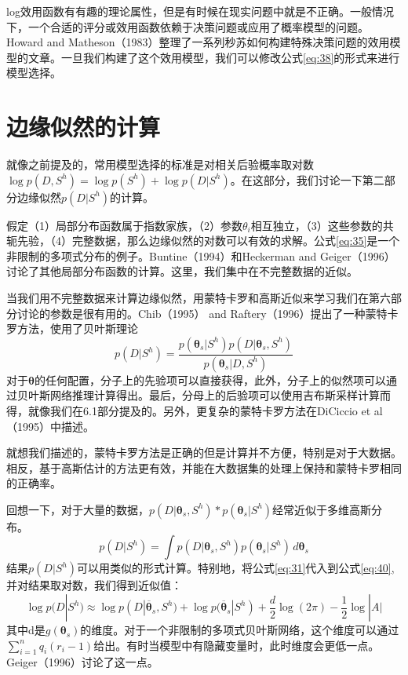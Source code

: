 \documentclass[10pt,a4paper]{article}
\begin{document}
\begin{CJK*}{UTF8}{gkai}
log效用函数有有趣的理论属性，但是有时候在现实问题中就是不正确。一般情况下，一个合适的评分或效用函数依赖于决策问题或应用了概率模型的问题。Howard and Matheson（1983）整理了一系列秒苏如何构建特殊决策问题的效用模型的文章。一旦我们构建了这个效用模型，我们可以修改公式\ref{eq:38}的形式来进行模型选择。



\section{边缘似然的计算}
就像之前提及的，常用模型选择的标准是对相关后验概率取对数$\log p(D,S^h)=\log p(S^h)+\log p(D|S^h)$。在这部分，我们讨论一下第二部分边缘似然$p(D|S^h)$的计算。


假定（1）局部分布函数属于指数家族，（2）参数$\theta_i$相互独立，（3）这些参数的共轭先验，（4）完整数据，那么边缘似然的对数可以有效的求解。公式\ref{eq:35}是一个非限制的多项式分布的例子。Buntine（1994）和Heckerman and Geiger（1996）讨论了其他局部分布函数的计算。这里，我们集中在不完整数据的近似。


当我们用不完整数据来计算边缘似然，用蒙特卡罗和高斯近似来学习我们在第六部分讨论的参数是很有用的。Chib（1995） and Raftery（1996）提出了一种蒙特卡罗方法，使用了贝叶斯理论
\begin{equation}
p(D|S^h)=\frac{p(\boldsymbol{\theta}_s|S^h)p(D|\boldsymbol{\theta}_s,S^h)}{p(\boldsymbol{\theta}_s|D,S^h)}
\end{equation}
对于$\boldsymbol{\theta}$的任何配置，分子上的先验项可以直接获得，此外，分子上的似然项可以通过贝叶斯网络推理计算得出。最后，分母上的后验项可以使用吉布斯采样计算而得，就像我们在6.1部分提及的。另外，更复杂的蒙特卡罗方法在DiCiccio et al（1995）中描述。


就想我们描述的，蒙特卡罗方法是正确的但是计算并不方便，特别是对于大数据。相反，基于高斯估计的方法更有效，并能在大数据集的处理上保持和蒙特卡罗相同的正确率。


回想一下，对于大量的数据，$p(D|\boldsymbol{\theta}_s,S^h)*p(\boldsymbol{\theta}_s|S^h)$经常近似于多维高斯分布。
\begin{equation}
\label{eq:40}
p(D|S^h)=\int p(D|\boldsymbol{\theta}_s,S^h)p(\boldsymbol{\theta}_s|S^h)\,d\boldsymbol{\theta}_s
\end{equation}
结果$p(D|S^h)$可以用类似的形式计算。特别地，将公式\ref{eq:31}代入到公式\ref{eq:40},并对结果取对数，我们得到近似值：
\begin{equation}
\log p(D|S^h) \approx \log p(D|\overline{\boldsymbol{\theta}}_s,S^h)+\log p(\overline{\boldsymbol{\theta}}_s|S^h)+\frac{d}{2}\log(2\pi)-\frac{1}{2}\log|A|
\end{equation}
其中d是$g(\boldsymbol{\theta}_s)$的维度。对于一个非限制的多项式贝叶斯网络，这个维度可以通过$\sum_{i=1}^n q_i(r_i-1)$给出。有时当模型中有隐藏变量时，此时维度会更低一点。Geiger（1996）讨论了这一点。



\end{CJK*}
\end{document}
